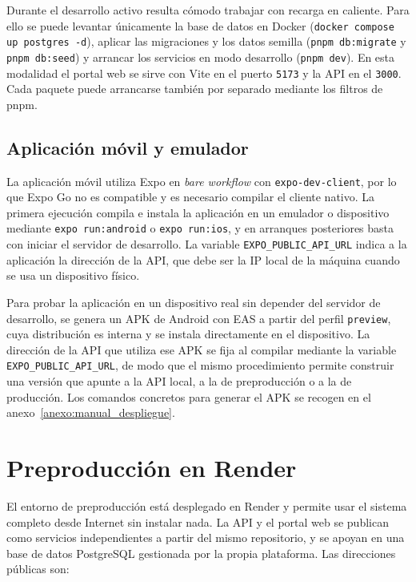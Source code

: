 Durante el desarrollo activo resulta cómodo trabajar con recarga en caliente. Para ello
se puede levantar únicamente la base de datos en Docker
(\texttt{docker compose up postgres -d}), aplicar las migraciones y los datos semilla
(\texttt{pnpm db:migrate} y \texttt{pnpm db:seed}) y arrancar los servicios en modo
desarrollo (\texttt{pnpm dev}). En esta modalidad el portal web se sirve con Vite en el
puerto \texttt{5173} y la API en el \texttt{3000}. Cada paquete puede arrancarse también
por separado mediante los filtros de pnpm.

\subsection{Aplicación móvil y emulador}

La aplicación móvil utiliza Expo en \textit{bare workflow} con \texttt{expo-dev-client},
por lo que Expo Go no es compatible y es necesario compilar el cliente nativo. La
primera ejecución compila e instala la aplicación en un emulador o dispositivo mediante
\texttt{expo run:android} o \texttt{expo run:ios}, y en arranques posteriores basta con
iniciar el servidor de desarrollo. La variable \texttt{EXPO\_PUBLIC\_API\_URL} indica a
la aplicación la dirección de la API, que debe ser la IP local de la máquina cuando se
usa un dispositivo físico.

Para probar la aplicación en un dispositivo real sin depender del servidor de
desarrollo, se genera un APK de Android con EAS a partir del perfil \texttt{preview},
cuya distribución es interna y se instala directamente en el dispositivo. La dirección
de la API que utiliza ese APK se fija al compilar mediante la variable
\texttt{EXPO\_PUBLIC\_API\_URL}, de modo que el mismo procedimiento permite construir una
versión que apunte a la API local, a la de preproducción o a la de producción. Los
comandos concretos para generar el APK se recogen en el anexo~\ref{anexo:manual_despliegue}.

\section{Preproducción en Render}

El entorno de preproducción está desplegado en Render y permite usar el sistema
completo desde Internet sin instalar nada. La API y el portal web se publican como
servicios independientes a partir del mismo repositorio, y se apoyan en una base de
datos PostgreSQL gestionada por la propia plataforma. Las direcciones públicas son:


